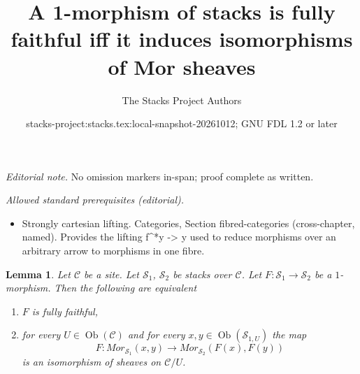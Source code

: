 \documentclass{stacks-project}
\title{A 1-morphism of stacks is fully faithful iff it induces isomorphisms of Mor sheaves}
\author{The Stacks Project Authors}
\date{stacks-project:stacks.tex:local-snapshot-20261012; GNU FDL 1.2 or later}
\theoremstyle{plain}
\newtheorem{lemma}[subsection]{Lemma}
\theoremstyle{definition}
\theoremstyle{remark}
\numberwithin{equation}{subsection}
\def\Ob{\mathop{\mathrm{Ob}}\nolimits}
\begin{document}
\maketitle
\noindent\textit{Editorial note.} No omission markers in-span; proof complete as written.\par\medskip
\noindent\textit{Allowed standard prerequisites (editorial).}\begin{itemize}
\item Strongly cartesian lifting. Categories, Section fibred-categories (cross-chapter, named). Provides the lifting f\textasciicircum{}*y -> y used to reduce morphisms over an arbitrary arrow to morphisms in one fibre.
\end{itemize}\medskip
\begin{lemma}
\label{lemma-characterize-ff}
Let $\mathcal{C}$ be a site.
Let $\mathcal{S}_1$, $\mathcal{S}_2$ be stacks over $\mathcal{C}$.
Let $F : \mathcal{S}_1 \to \mathcal{S}_2$ be a $1$-morphism.
Then the following are equivalent
\begin{enumerate}
\item $F$ is fully faithful,
\item for every $U \in \Ob(\mathcal{C})$ and for every
$x, y \in \Ob(\mathcal{S}_{1, U})$ the map
$$
F :
\mathit{Mor}_{\mathcal{S}_1}(x, y)
\longrightarrow
\mathit{Mor}_{\mathcal{S}_2}(F(x), F(y))
$$
is an isomorphism of sheaves on $\mathcal{C}/U$.
\end{enumerate}
\end{lemma}
\end{document}
